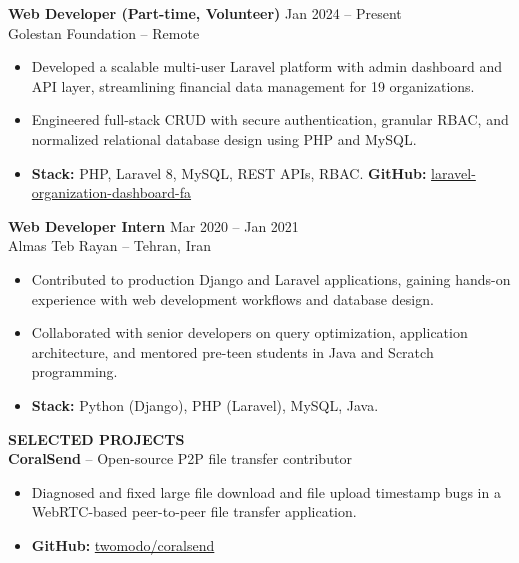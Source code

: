 \documentclass[10pt,letterpaper]{article}
\begin{document}
\vspace{4pt}

\textbf{Web Developer (Part-time, Volunteer)} \hfill Jan 2024 -- Present\\
Golestan Foundation -- Remote
\begin{itemize}
    \item Developed a scalable multi-user Laravel platform with admin dashboard and API layer, streamlining financial data management for 19 organizations.
    \item Engineered full-stack CRUD with secure authentication, granular RBAC, and normalized relational database design using PHP and MySQL.
    \item \textbf{Stack:} PHP, Laravel 8, MySQL, REST APIs, RBAC. \textbf{GitHub:} \href{https://github.com/parsasamandi/laravel-organization-dashboard-fa}{laravel-organization-dashboard-fa}
\end{itemize}

\vspace{4pt}

\textbf{Web Developer Intern} \hfill Mar 2020 -- Jan 2021\\
Almas Teb Rayan -- Tehran, Iran
\begin{itemize}
    \item Contributed to production Django and Laravel applications, gaining hands-on experience with web development workflows and database design.
    \item Collaborated with senior developers on query optimization, application architecture, and mentored pre-teen students in Java and Scratch programming.
    \item \textbf{Stack:} Python (Django), PHP (Laravel), MySQL, Java.
\end{itemize}

\vspace{5pt}

\textbf{SELECTED PROJECTS}\\[4pt]


\textbf{CoralSend} -- Open-source P2P file transfer contributor
\begin{itemize}
    \item Diagnosed and fixed large file download and file upload timestamp bugs in a WebRTC-based peer-to-peer file transfer application.
    \item \textbf{GitHub:} \href{https://github.com/twomodo/coralsend}{twomodo/coralsend}
\end{itemize}
\end{document}
